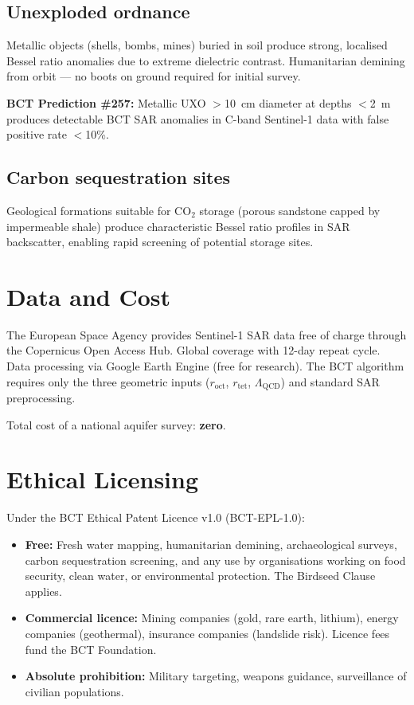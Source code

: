\documentclass[aps,prl,twocolumn,superscriptaddress]{revtex4-2}
\begin{document}
\subsection{Unexploded ordnance}
Metallic objects (shells, bombs, mines) buried in soil produce strong, localised Bessel ratio anomalies due to extreme dielectric contrast. Humanitarian demining from orbit --- no boots on ground required for initial survey.

\textbf{BCT Prediction \#257:} Metallic UXO $>$10~cm diameter at depths $<$2~m produces detectable BCT SAR anomalies in C-band Sentinel-1 data with false positive rate $<$10\%.

\subsection{Carbon sequestration sites}
Geological formations suitable for CO$_2$ storage (porous sandstone capped by impermeable shale) produce characteristic Bessel ratio profiles in SAR backscatter, enabling rapid screening of potential storage sites.

\section{Data and Cost}

The European Space Agency provides Sentinel-1 SAR data free of charge through the Copernicus Open Access Hub. Global coverage with 12-day repeat cycle. Data processing via Google Earth Engine (free for research). The BCT algorithm requires only the three geometric inputs ($r_{\mathrm{oct}}$, $r_{\mathrm{tet}}$, $\Lambda_{\mathrm{QCD}}$) and standard SAR preprocessing.

Total cost of a national aquifer survey: \textbf{zero}.

\section{Ethical Licensing}

Under the BCT Ethical Patent Licence v1.0 (BCT-EPL-1.0):

\begin{itemize}
\item \textbf{Free:} Fresh water mapping, humanitarian demining, archaeological surveys, carbon sequestration screening, and any use by organisations working on food security, clean water, or environmental protection. The Birdseed Clause applies.
\item \textbf{Commercial licence:} Mining companies (gold, rare earth, lithium), energy companies (geothermal), insurance companies (landslide risk). Licence fees fund the BCT Foundation.
\item \textbf{Absolute prohibition:} Military targeting, weapons guidance, surveillance of civilian populations.
\end{itemize}
\end{document}
